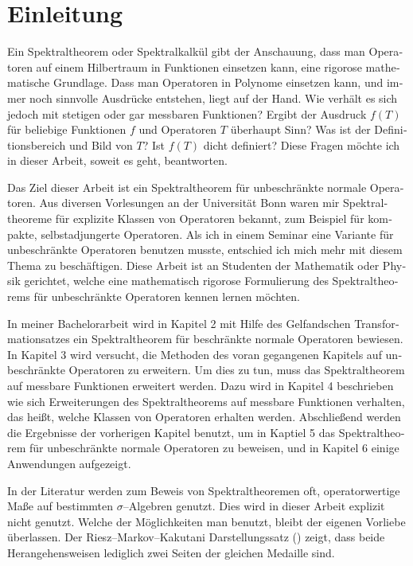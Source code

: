 \section*{Einleitung}


\begin{otherlanguage}{ngerman}
Ein Spektraltheorem oder Spektralkalkül gibt der Anschauung, dass man 
Operatoren auf einem Hilbertraum in Funktionen einsetzen kann, eine 
rigorose mathematische Grundlage.
Dass man Operatoren in Polynome einsetzen kann, und immer noch sinnvolle
Ausdrücke entstehen, liegt auf der Hand. Wie verhält es sich jedoch mit
stetigen oder gar messbaren Funktionen? Ergibt der Ausdruck $f(T)$ für
beliebige Funktionen $f$ und Operatoren $T$ überhaupt Sinn? Was ist 
der Definitionsbereich und Bild von $T$? Ist $f(T)$ dicht definiert?
Diese Fragen möchte ich in dieser Arbeit, soweit es geht, beantworten.

Das Ziel dieser Arbeit ist ein Spektraltheorem für unbeschränkte normale 
Operatoren. Aus diversen Vorlesungen an der Universität Bonn waren mir
Spektraltheoreme für explizite Klassen von Operatoren bekannt, zum 
Beispiel für kompakte, selbstadjungerte Operatoren. Als ich in einem Seminar
eine Variante für unbeschränkte Operatoren benutzen musste, entschied ich
mich mehr mit diesem Thema zu beschäftigen. Diese Arbeit
ist an Studenten der Mathematik oder Physik gerichtet, welche eine 
mathematisch rigorose Formulierung des Spektraltheorems
für unbeschränkte Operatoren kennen lernen möchten.

In meiner Bachelorarbeit wird in Kapitel 2 mit Hilfe des Gelfandschen 
Transformationsatzes ein Spektraltheorem für beschränkte normale Operatoren 
bewiesen. In Kapitel 3 wird versucht, die Methoden des voran gegangenen Kapitels
auf unbeschränkte Operatoren zu erweitern. Um dies zu tun, muss das 
Spektraltheorem auf messbare Funktionen erweitert werden.
Dazu wird in Kapitel 4 beschrieben wie sich Erweiterungen des 
Spektraltheorems auf messbare Funktionen verhalten, das heißt, welche Klassen
von Operatoren erhalten werden. Abschließend werden die Ergebnisse der 
vorherigen Kapitel benutzt, um in Kaptiel 5 das Spektraltheorem für unbeschränkte normale
Operatoren zu beweisen, und in Kapitel 6 einige Anwendungen aufgezeigt.

In der Literatur werden zum Beweis von Spektraltheoremen oft, operatorwertige
Maße auf bestimmten $\sigma$--Algebren genutzt.
Dies wird in dieser Arbeit explizit nicht genutzt. Welche der Möglichkeiten
man benutzt, bleibt der eigenen Vorliebe überlassen. Der Riesz--Markov--Kakutani
Darstellungssatz (\cite[Theorem 6.3.4]{PedAnaN})
zeigt, dass beide Herangehensweisen
lediglich zwei Seiten der gleichen Medaille sind. 


\end{otherlanguage}
